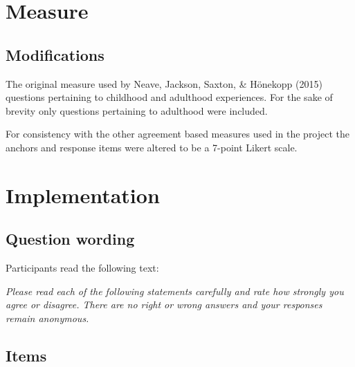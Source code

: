 \documentclass[
  letterpaper,
]{scrbook}
\begin{document}
\section{Measure}\label{measure-9}

\subsection*{Modifications}\label{modifications-8}

The original measure used by Neave, Jackson, Saxton, \& Hönekopp (2015)
questions pertaining to childhood and adulthood experiences. For the
sake of brevity only questions pertaining to adulthood were included.

For consistency with the other agreement based measures used in the
project the anchors and response items were altered to be a 7-point
Likert scale.

\section{Implementation}\label{implementation-9}

\subsection*{Question wording}\label{question-wording-9}

Participants read the following text:

\emph{Please read each of the following statements carefully and rate
how strongly you agree or disagree. There are no right or wrong answers
and your responses remain anonymous.}

\subsection*{Items}\label{items-9}
\end{document}
